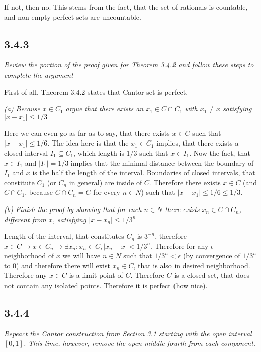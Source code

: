\documentclass[11pt,oneside,titlepage]{book}
\begin{document}
If not, then no. This stems from the fact, that the set of rationals is
countable, and non-empty perfect sets are uncountable.

\subsection*{3.4.3}
\textit{Review the portion of the proof given for Theorem 3.4.2 and follow
  these steps to complete the argument}

First of all, Theorem 3.4.2 states that Cantor set is perfect.

\textit{(a) Because $x \in C_1$ argue that there exists an $x_1 \in C \cap C_1$
  with $x_1 \neq x$ satisfying $|x - x_1| \leq 1/3$}

Here we can even go as far as to say, that there exists $x \in C$ such that
$|x - x_1| \leq 1/6$. The idea here is that the $x_1 \in C_1$ implies,
that there exists a closed interval $I_1 \subseteq C_1$, which length is $1/3$
such that $x \in I_1$. Now the fact, that $x \in I_1$ and $|I_1| = 1/3$ implies
that the minimal distance between the boundary of
$I_1$ and $x$ is the half the length  of the interval. Boundaries of
closed intervals, that constitute $C_1$ (or
$C_n$ in general) are inside of $C$. Therefore there exists $x \in C$ (and
$C \cap C_1$, because $C \cap C_n = C$ for every $n \in N$) such
that  $|x - x_1| \leq 1/6 \leq 1/3$.

\textit{(b) Finish the proof by showing that for each $n \in N$ there exists
  $x_n \in C \cap C_n$, different from $x$, satisfying
  $|x - x_n| \leq  1/3^n$}

Length of the interval, that constitutes $C_n$  is $3^{-n}$, therefore
$x \in C \to x \in C_n \to \exists x_n: x_n \in C, |x_n - x| < 1/3^n$.
Therefore for  any $\epsilon$-neighborhood of $x$ we will have $n \in N$ such
that $1/3^n < \epsilon$ (by convergence of $1/3^n$ to 0) and therefore
there will exist $x_n \in C$, that is also in desired neighborhood.
Therefore any $x \in C$ is a limit point of $C$. Therefore $C$ is a closed
set, that does not contain any isolated points. Therefore it is perfect
(how nice).

\subsection*{3.4.4}
\textit{Repeact the Cantor construction from Section 3.1 starting with the
  open interval $[0,1]$. This time, however, remove the open middle fourth
  from each component.}
\end{document}
